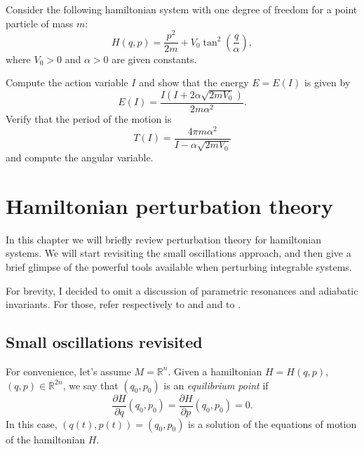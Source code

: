 \documentclass[english,fontsize=11pt,paper=a5,oneside]{scrbook}
\newcommand{\R}{\mathbb{R}}
\theoremstyle{definition}
\newenvironment{exercise}
  {\pushQED{\qed}\renewcommand{\qedsymbol}{$\maltese$}\exercisex}
  {\popQED\endexercisex}
\begin{document}
\begin{exercise}[Anharmonic oscillator]
    Consider the following hamiltonian system with one degree of freedom for a point particle of mass $m$:
    \begin{equation}
        H(q,p) = \frac{p^2}{2m} + V_0 \tan^2\left(\frac{q}{\alpha}\right),
    \end{equation}
    where $V_0>0$ and $\alpha>0$ are given constants.

    Compute the action variable $I$ and show that the energy $E = E(I)$ is given by
    \begin{equation}
        E(I) = \frac{I (I + 2\alpha\sqrt{2m V_0})}{2m\alpha^2}.
    \end{equation}
    Verify that the period of the motion is
    \begin{equation}
        T(I) = \frac{4 \pi m \alpha^2}{I - \alpha \sqrt{2mV_0}}
    \end{equation}
    and compute the angular variable.
\end{exercise}


\chapter{Hamiltonian perturbation theory}

In this chapter we will briefly review perturbation theory for hamiltonian systems.
We will start revisiting the small oscillations approach, and then give a brief glimpse of the powerful tools available when perturbing integrable systems.

For brevity, I decided to omit a discussion of parametric resonances and adiabatic invariants.
For those, refer respectively to \cite[Chpater 25]{book:arnold} and \cite[Chapter 5.4]{book:knauf} and to \cite[Chapter 15.1]{book:knauf}.

\section{Small oscillations revisited}
For convenience, let's assume $M=\R^n$.
Given a hamiltonian $H=H(q,p)$, $(q,p)\in\R^{2n}$, we say that $(q_0, p_0)$ is an \emph{equilibrium point} if
\begin{equation}
    \frac{\partial H}{\partial q}(q_0, p_0) = \frac{\partial H}{\partial p}(q_0, p_0) = 0.
\end{equation}
In this case, $(q(t), p(t)) = (q_0, p_0)$ is a solution of the equations of motion of the hamiltonian $H$.
\end{document}
